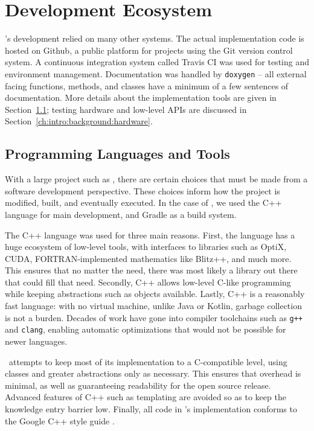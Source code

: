 \section{Development Ecosystem}
\label{ch:intro:background:development_ecosystem}

\name's development relied on many other systems.
The actual implementation code is hosted on Github, a public platform for projects using the Git version control system.
A continuous integration system called Travis CI \cite{travisci} was used for testing and environment management.
Documentation was handled by \texttt{doxygen} \cite{van2008doxygen} -- all external facing functions, methods, and classes have a minimum of a few sentences of documentation.
More details about the implementation tools are given in Section~\ref{ch:intro:background:languages_and_libraries}; testing hardware and low-level APIs are discussed in Section~\ref{ch:intro:background:hardware}.

\subsection{Programming Languages and Tools}
\label{ch:intro:background:languages_and_libraries}

With a large project such as \name, there are certain choices that must be made from a software development perspective.
These choices inform how the project is modified, built, and eventually executed.
In the case of \name, we used the C++ language \cite{cpp14standard} for main development, and Gradle \cite{gradle} as a build system.


The C++ language was used for three main reasons.
First, the language has a huge ecosystem of low-level tools, with interfaces to libraries such as OptiX, CUDA, FORTRAN-implemented mathematics like Blitz++, and much more.
This ensures that no matter the need, there was most likely a library out there that could fill that need.
Secondly, C++ allows low-level C-like programming while keeping abstractions such as objects available.
Lastly, C++ is a reasonably fast language: with no virtual machine, unlike Java or Kotlin, garbage collection is not a burden.
Decades of work have gone into compiler toolchains such as \texttt{g++} and \texttt{clang}, enabling automatic optimizations that would not be possible for newer languages.

\name\ attempts to keep most of its implementation to a C-compatible level, using classes and greater abstractions only as necessary.
This ensures that overhead is minimal, as well as guaranteeing readability for the open source release.
Advanced features of C++ such as templating are avoided so as to keep the knowledge entry barrier low.
Finally, all code in \name's implementation conforms to the Google C++ style guide \cite{googleStyleGuide}.

